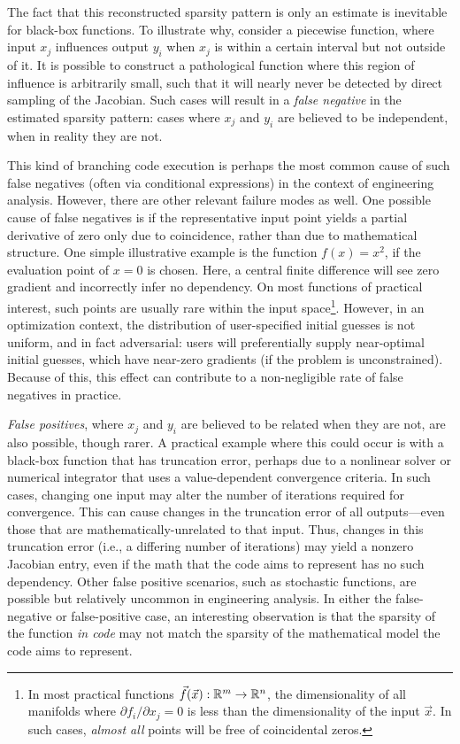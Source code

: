 The fact that this reconstructed sparsity pattern is only an estimate is inevitable for black-box functions. To illustrate why, consider a piecewise function, where input $x_j$ influences output $y_i$ when $x_j$ is within a certain interval but not outside of it. It is possible to construct a pathological function where this region of influence is arbitrarily small, such that it will nearly never be detected by direct sampling of the Jacobian. Such cases will result in a \emph{false negative} in the estimated sparsity pattern: cases where $x_j$ and $y_i$ are believed to be independent, when in reality they are not.

This kind of branching code execution is perhaps the most common cause of such false negatives (often via conditional expressions) in the context of engineering analysis. However, there are other relevant failure modes as well. One possible cause of false negatives is if the representative input point yields a partial derivative of zero only due to coincidence, rather than due to mathematical structure. One simple illustrative example is the function $f(x) = x^2$, if the evaluation point of $x = 0$ is chosen. Here, a central finite difference will see zero gradient and incorrectly infer no dependency. On most functions of practical interest, such points are usually rare within the input space\footnote{In most practical functions $\vec{f}(\vec{x}): \mathbb{R}^m \rightarrow \mathbb{R}^n$, the dimensionality of all manifolds where $\partial f_i/\partial x_j=0$ is less than the dimensionality of the input $\vec{x}$. In such cases, \emph{almost all} points will be free of coincidental zeros.}. However, in an optimization context, the distribution of user-specified initial guesses is not uniform, and in fact adversarial: users will preferentially supply near-optimal initial guesses, which have near-zero gradients (if the problem is unconstrained). Because of this, this effect can contribute to a non-negligible rate of false negatives in practice.

\emph{False positives}, where $x_j$ and $y_i$ are believed to be related when they are not, are also possible, though rarer. A practical example where this could occur is with a black-box function that has truncation error, perhaps due to a nonlinear solver or numerical integrator that uses a value-dependent convergence criteria. In such cases, changing one input may alter the number of iterations required for convergence. This can cause changes in the truncation error of all outputs—even those that are mathematically-unrelated to that input. Thus, changes in this truncation error (i.e., a differing number of iterations) may yield a nonzero Jacobian entry, even if the math that the code aims to represent has no such dependency. Other false positive scenarios, such as stochastic functions, are possible but relatively uncommon in engineering analysis. In either the false-negative or false-positive case, an interesting observation is that the sparsity of the function \emph{in code} may not match the sparsity of the mathematical model the code aims to represent.

